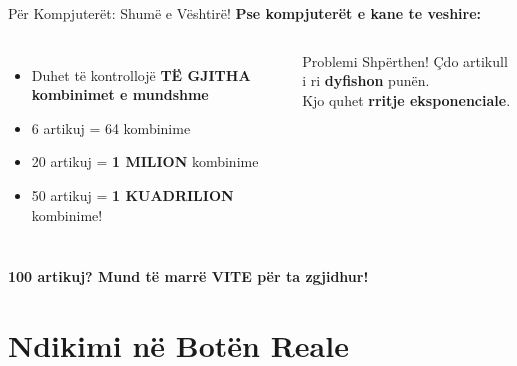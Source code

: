 \documentclass[aspectratio=169]{beamer}
\begin{document}
\begin{frame}{Për Kompjuterët: Shumë e Vështirë!}
\textbf{Pse kompjuterët e kane te veshire:}

\begin{columns}
\begin{itemize}
    \item Duhet të kontrollojë \textbf{TË GJITHA kombinimet e mundshme}
    \item 6 artikuj = 64 kombinime
    \item 20 artikuj = \textbf{1 MILION} kombinime
    \item 50 artikuj = \textbf{1 KUADRILION} kombinime!
\end{itemize}

\vspace{0.3cm}
\begin{block}{Problemi Shpërthen!}
Çdo artikull i ri \textbf{dyfishon} punën.\\
Kjo quhet \textbf{rritje eksponenciale}.
\end{block}

\end{columns}

\vspace{0.3cm}
\begin{center}
\textcolor{aired}{\Large \textbf{100 artikuj? Mund të marrë VITE për ta zgjidhur!}}
\end{center}
\end{frame}


\section{Ndikimi në Botën Reale}
\end{document}

